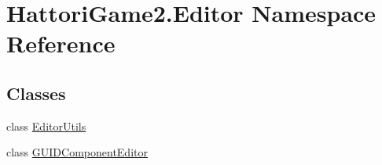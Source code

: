 \hypertarget{namespace_hattori_game2_1_1_editor}{}\section{Hattori\+Game2.\+Editor Namespace Reference}
\label{namespace_hattori_game2_1_1_editor}
\subsection*{Classes}
\begin{DoxyCompactItemize}
\item 
class \hyperlink{class_hattori_game2_1_1_editor_1_1_editor_utils}{Editor\+Utils}
\item 
class \hyperlink{class_hattori_game2_1_1_editor_1_1_g_u_i_d_component_editor}{G\+U\+I\+D\+Component\+Editor}
\end{DoxyCompactItemize}
